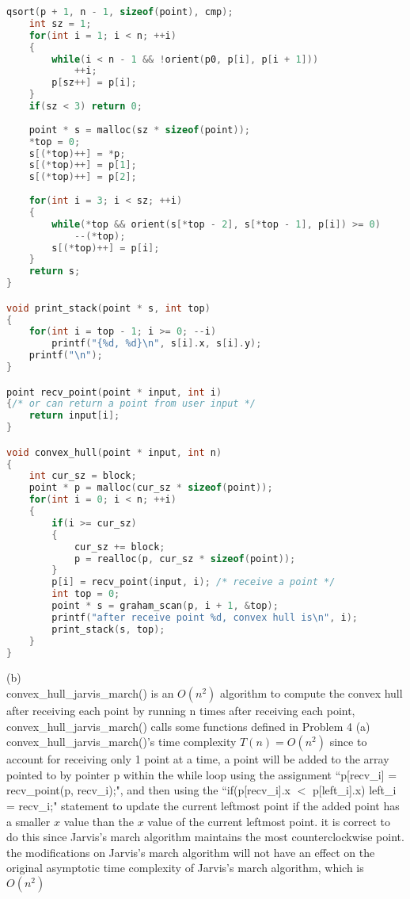 \documentclass[12pt,border=4pt,multi]{article} %
\begin{document}
\begin{lstlisting}[language = c]
    qsort(p + 1, n - 1, sizeof(point), cmp);
    int sz = 1;
    for(int i = 1; i < n; ++i)
    {
        while(i < n - 1 && !orient(p0, p[i], p[i + 1]))
            ++i;
        p[sz++] = p[i];
    }
    if(sz < 3) return 0;
    
    point * s = malloc(sz * sizeof(point));
    *top = 0;
    s[(*top)++] = *p;
    s[(*top)++] = p[1];
    s[(*top)++] = p[2];
    
    for(int i = 3; i < sz; ++i)
    {
        while(*top && orient(s[*top - 2], s[*top - 1], p[i]) >= 0)
            --(*top);
        s[(*top)++] = p[i];
    }
    return s;
}

void print_stack(point * s, int top)
{
    for(int i = top - 1; i >= 0; --i)
        printf("{%d, %d}\n", s[i].x, s[i].y);
    printf("\n");
}

point recv_point(point * input, int i)
{/* or can return a point from user input */
    return input[i];
}

void convex_hull(point * input, int n)
{
    int cur_sz = block;
    point * p = malloc(cur_sz * sizeof(point));
    for(int i = 0; i < n; ++i)
    {
        if(i >= cur_sz)
        {
            cur_sz += block;
            p = realloc(p, cur_sz * sizeof(point));
        }
        p[i] = recv_point(input, i); /* receive a point */
        int top = 0;
        point * s = graham_scan(p, i + 1, &top);
        printf("after receive point %d, convex hull is\n", i);
        print_stack(s, top);
    }
}
\end{lstlisting}
\newpage
\noindent
(b)\\
convex\_hull\_jarvis\_march() is an $O(n^2)$ algorithm
to compute the convex hull 
after receiving each point
by running n times 
after receiving each point, convex\_hull\_jarvis\_march() calls some functions defined in Problem 4 (a)\\
convex\_hull\_jarvis\_march()'s time complexity $T(n) = O(n^2)$ since to account for receiving only 1 point at a time, a point will be added to the array pointed to by pointer p within the while loop using the assignment ``p[recv\_i] = recv\_point(p, recv\_i);", and then using the         ``if(p[recv\_i].x $<$ p[left\_i].x) left\_i = recv\_i;" statement to update the current leftmost point if the added point has a smaller $x$ value than the $x$ value of the current leftmost point. it is correct to do this since Jarvis's march algorithm maintains the most counterclockwise point. the modifications on Jarvis's march algorithm will not have an effect on the original asymptotic time complexity of Jarvis's march algorithm, which is $O(n^2)$\\
\end{document}
